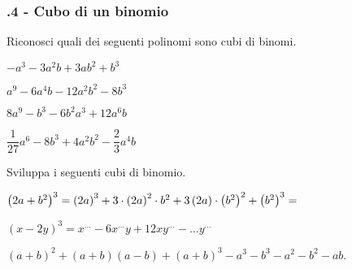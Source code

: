 \subsubsection*{\thechapter.4 - Cubo di un binomio}

\begin{esercizio}
 \label{ese:11.24}
Riconosci quali dei seguenti polinomi sono cubi di binomi.
\TabPositions{5cm}
\begin{enumeratea}
 \item $-a^{3}-3a^{2}b+3{ab}^{2}+b^{3}$ \tab\boxSi\quad\boxNo
 \item $a^{9}-6a^{4}b-12a^{2}b^{2}-8b^{3}$ \tab\boxSi\quad\boxNo
 \item $8a^{9}-b^{3}-6b^{2}a^{3}+12a^{6}b$ \tab\boxSi\quad\boxNo
 \item $\dfrac{1}{27}a^{6}-8b^{3}+4a^{2}b^{2}-\dfrac{2}{3}a^{4}b$ \tab\boxSi\quad\boxNo
\end{enumeratea}
\end{esercizio}

\begin{esercizio}
 \label{ese:11.25}
 Sviluppa i seguenti cubi di binomio.

 \begin{enumeratea}
\item $ \left(2a+b^{2}\right)^{3}=\left(2a\right)^{3}+3\cdot\left(2a\right)^{2}\cdot b^{2}+3\left(2a\right)\cdot\left(b^{2}\right)^{2}+\left(b^{2}\right)^{3}=\dotfill~$
\item $\left(x-2y\right)^{3}=x^{\ldots }-6x^{\ldots }y+12{xy}^{\ldots}-\ldots y^{\ldots }$
\item $(a+b)^{2}+(a+b)(a-b)+(a+b)^{3}-a^{3}-b^{3}-a^{2}-b^{2}-{ab}$.
\end{enumeratea}
\end{esercizio}


